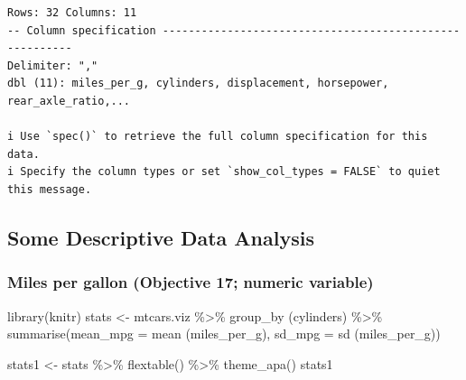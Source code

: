 \documentclass[
  man,
  floatsintext,
  longtable,
  nolmodern,
  notxfonts,
  notimes,
  colorlinks=true,linkcolor=blue,citecolor=blue,urlcolor=blue]{apa7}
\newenvironment{Shaded}{\begin{snugshade}}{\end{snugshade}}
\newcommand{\AttributeTok}[1]{\textcolor[rgb]{0.40,0.45,0.13}{#1}}
\newcommand{\FunctionTok}[1]{\textcolor[rgb]{0.28,0.35,0.67}{#1}}
\newcommand{\NormalTok}[1]{\textcolor[rgb]{0.00,0.23,0.31}{#1}}
\newcommand{\OtherTok}[1]{\textcolor[rgb]{0.00,0.23,0.31}{#1}}
\newcommand{\SpecialCharTok}[1]{\textcolor[rgb]{0.37,0.37,0.37}{#1}}
\begin{document}
\begin{verbatim}
Rows: 32 Columns: 11
-- Column specification --------------------------------------------------------
Delimiter: ","
dbl (11): miles_per_g, cylinders, displacement, horsepower, rear_axle_ratio,...

i Use `spec()` to retrieve the full column specification for this data.
i Specify the column types or set `show_col_types = FALSE` to quiet this message.
\end{verbatim}

\subsection{Some Descriptive Data
Analysis}\label{some-descriptive-data-analysis}

\subsubsection{Miles per gallon (Objective 17; numeric
variable)}\label{miles-per-gallon-objective-17-numeric-variable}

\begin{Shaded}
\begin{Highlighting}[]
\FunctionTok{library}\NormalTok{(knitr)}
\NormalTok{stats }\OtherTok{\textless{}{-}}\NormalTok{ mtcars.viz }\SpecialCharTok{\%\textgreater{}\%} \FunctionTok{group\_by}\NormalTok{ (cylinders) }\SpecialCharTok{\%\textgreater{}\%} 
  \FunctionTok{summarise}\NormalTok{(}\AttributeTok{mean\_mpg =} \FunctionTok{mean}\NormalTok{ (miles\_per\_g),}
                         \AttributeTok{sd\_mpg =} \FunctionTok{sd}\NormalTok{ (miles\_per\_g))}

\NormalTok{stats1 }\OtherTok{\textless{}{-}}\NormalTok{ stats }\SpecialCharTok{\%\textgreater{}\%} \FunctionTok{flextable}\NormalTok{() }\SpecialCharTok{\%\textgreater{}\%} 
  \FunctionTok{theme\_apa}\NormalTok{() }
\NormalTok{stats1}
\end{Highlighting}
\end{Shaded}
\end{document}
